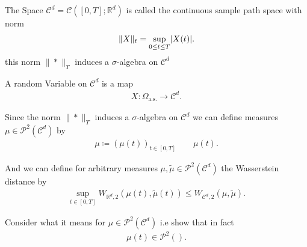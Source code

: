 \begin{definition}
 The Space  $\mathcal{C}^{d} = \mathcal{C}([0,T];\mathbb{R}^{d} ) $ is called the continuous sample path space with norm 
 \begin{align*}
   \|X\|_t = \sup_{0\le t \le T} \lvert X(t)\rvert
 .\end{align*}
 this norm $\|*\|_T$ induces a $\sigma$-algebra on $\mathcal{C}^{d} $ 
\end{definition}
\begin{definition}
  A random Variable on $\mathcal{C}^{d} $ is a map 
  \begin{align*}
    X : \Omega_{\text{a.s.}} \to \mathcal{C}^{d} 
  .\end{align*}
\end{definition}
\begin{definition}[Measure]
 Since the norm $\|*\|_T$  induces a $\sigma$-algebra on $\mathcal{C}^{d} $ we can define measures $\mu \in \mathcal{P}^2(\mathcal{C}^{d} )$ by 
 \begin{align*}
   \mu  \coloneqq  (\mu(t))_{t \in  [0,T]} \qquad \mu(t)
 .\end{align*}
\end{definition}
\begin{definition}
And we can define for arbitrary measures $\mu ,\tilde{\mu } \in  \mathcal{P}^2(\mathcal{C}^{d} ) $ the Wasserstein distance by
\begin{align*}
  \sup_{t \in  [0,T]} W_{\mathbb{R}^{d},2 }(\mu(t),\tilde{\mu }(t) ) \le  W_{\mathcal{C}^{d},2 } (\mu ,\tilde{\mu } )
.\end{align*}
\end{definition}
\begin{exercise}
 Consider what it means for $\mu  \in  \mathcal{P}^2(\mathcal{C}^{d} )$  i.e show that in fact 
 \begin{align*}
  \mu(t) \in  \mathcal{P}^2()
 .\end{align*}
\end{exercise}
